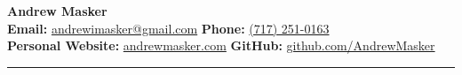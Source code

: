 \begin{center}
    {\LARGE \textbf{Andrew Masker}}\\[6pt]
    \textbf{Email:} \href{mailto:andrewimasker@gmail.com}{andrewimasker@gmail.com} \quad\textbar\quad
    \textbf{Phone:} \href{tel:+17172510163}{(717) 251-0163}\\[2pt]
    \textbf{Personal Website:} \href{https://andrewmasker.com}{andrewmasker.com} \quad\textbar\quad
    \textbf{GitHub:} \href{https://github.com/AndrewMasker}{github.com/AndrewMasker}
\end{center}
\vspace{-6pt}
\hrule
